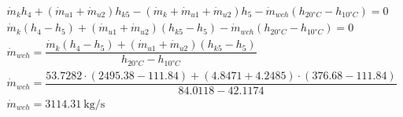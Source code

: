 \renewcommand{\arraystretch}{1.5}
\begin{math}
	\begin{array}{l}
		\dot m_k h_4 + (\dot m_{u1} + \dot m_{u2}) h_{k5}
			- (\dot m_k + \dot m_{u1} + \dot m_{u2}) h_5
			- \dot m_{wch} (h_{20°C} - h_{10°C}) = 0 \\
		\dot m_k (h_4 - h_5) + (\dot m_{u1} + \dot m_{u2}) (h_{k5} - h_5)
			- \dot m_{wch} (h_{20°C} - h_{10°C}) = 0 \\

		\dot m_{wch} = \dfrac{\dot m_k (h_4 - h_5)
			+ (\dot m_{u1} + \dot m_{u2})(h_{k5} - h_5)
			}{h_{20°C} - h_{10°C}} \\
		\dot m_{wch} = \dfrac{\num{53,7282} \cdot (\num{2495,38} - \num{111,84})
				+ (\num{4,8471} + \num{4,2485}) \cdot (\num{376,68} - \num{111,84})
				}{\num{84,0118} - \num{42,1174}} \\
		\dot m_{wch} = \SI{3114,31}{\kilogram\per\second} \\
	\end{array}
\end{math}
